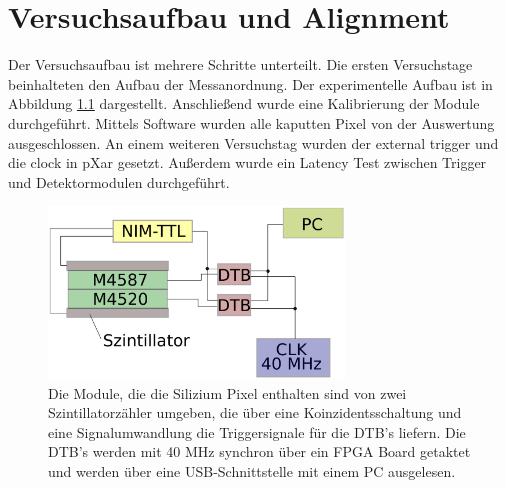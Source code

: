 \documentclass[usenames,dvipsnames]{include/protokollclass}
\begin{document}
    \FrontMatter
\begin{titlepage}


\end{titlepage}

    \begingroup \let\clearpage\relax    %
    \tableofcontents                    %
    \listoffigures
    \listoftables
    \endgroup



    \MainMatter
    
            
%    
%
%    
%
%	 
%
	
	\chapter{Versuchsaufbau und Alignment}
	Der Versuchsaufbau ist mehrere Schritte unterteilt.
	Die ersten Versuchstage beinhalteten den Aufbau der Messanordnung. Der experimentelle Aufbau ist in Abbildung \ref{fig:aufbau} dargestellt. Anschließend wurde eine Kalibrierung der Module durchgeführt. Mittels Software wurden alle kaputten Pixel von der Auswertung ausgeschlossen.
	An einem weiteren Versuchstag wurden der external trigger und die clock in pXar gesetzt.
	Außerdem wurde ein Latency Test zwischen Trigger und Detektormodulen durchgeführt.
	
	\begin{figure}
		\centering
		\includegraphics[width=0.7\textwidth]{fig/aufbau.eps}
		\caption{Die Module, die die Silizium Pixel enthalten sind von zwei Szintillatorzähler umgeben, die über eine Koinzidentsschaltung und eine Signalumwandlung die Triggersignale für die DTB's liefern. Die DTB's werden mit 40 MHz synchron über ein FPGA Board getaktet und werden über eine USB-Schnittstelle mit einem PC ausgelesen.}
		\label{fig:aufbau}
	\end{figure}
\end{document}
